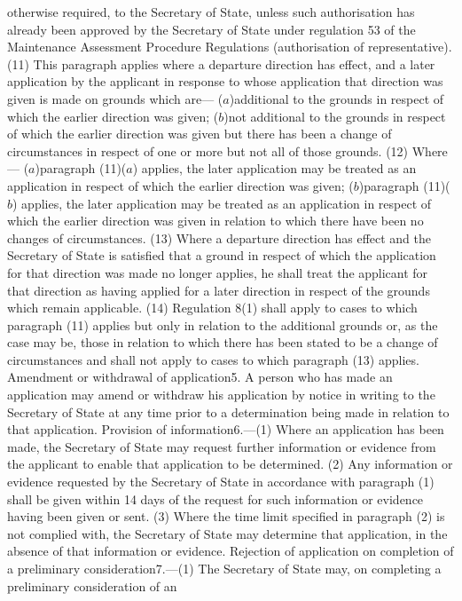 \documentclass[a4paper]{article}
\begin{document}
otherwise required, to the Secretary of State, unless such authorisation has
already been approved by the Secretary of State under regulation 53 of the
Maintenance Assessment Procedure Regulations (authorisation of representative).
(11) This paragraph applies where a departure direction has effect, and a later
application by the applicant in response to whose application that direction was
given is made on grounds which are—
($a$)additional to the grounds in respect of which the earlier direction was
given;
($b$)not additional to the grounds in respect of which the earlier direction was
given but there has been a change of circumstances in respect of one or more but
not all of those grounds.
(12) Where—
($a$)paragraph (11)($a$) applies, the later application may be treated as an
application in respect of which the earlier direction was given;
($b$)paragraph (11)($b$) applies, the later application may be treated as an
application in respect of which the earlier direction was given in relation to
which there have been no changes of circumstances.
(13) Where a departure direction has effect and the Secretary of State is
satisfied that a ground in respect of which the application for that direction
was made no longer applies, he shall treat the applicant for that direction as
having applied for a later direction in respect of the grounds which remain
applicable.
(14) Regulation 8(1) shall apply to cases to which paragraph (11) applies but
only in relation to the additional grounds or, as the case may be, those in
relation to which there has been stated to be a change of circumstances and
shall not apply to cases to which paragraph (13) applies.
Amendment or withdrawal of application5. A person who has made an application
may amend or withdraw his application by notice in writing to the Secretary of
State at any time prior to a determination being made in relation to that
application.
Provision of information6.—(1) Where an application has been made, the Secretary
of State may request further information or evidence from the applicant to
enable that application to be determined.
(2) Any information or evidence requested by the Secretary of State in
accordance with paragraph (1) shall be given within 14 days of the request for
such information or evidence having been given or sent.
(3) Where the time limit specified in paragraph (2) is not complied with, the
Secretary of State may determine that application, in the absence of that
information or evidence.
Rejection of application on completion of a preliminary consideration7.—(1) The
Secretary of State may, on completing a preliminary consideration of an
\end{document}
